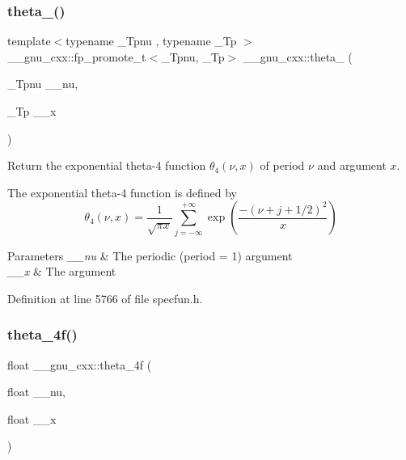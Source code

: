 \subsubsection{\texorpdfstring{theta\+\_()}{theta\_4()}}
{\footnotesize\ttfamily template$<$typename \+\_\+\+Tpnu , typename \+\_\+\+Tp $>$ \\
\+\_\+\+\_\+gnu\+\_\+cxx\+::fp\+\_\+promote\+\_\+t$<$\+\_\+\+Tpnu, \+\_\+\+Tp$>$ \+\_\+\+\_\+gnu\+\_\+cxx\+::theta\+\_ (\begin{DoxyParamCaption}\item[{\+\_\+\+Tpnu}]{\+\_\+\+\_\+nu,  }\item[{\+\_\+\+Tp}]{\+\_\+\+\_\+x }\end{DoxyParamCaption})\hspace{0.3cm}{\ttfamily [inline]}}

Return the exponential theta-\/4 function $ \theta_4(\nu,x) $ of period $ \nu $ and argument $ x $.

The exponential theta-\/4 function is defined by \[ \theta_4(\nu,x) = \frac{1}{\sqrt{\pi x}} \sum_{j=-\infty}^{+\infty} \exp\left( \frac{-(\nu + j + 1/2)^2}{x} \right) \]


\begin{DoxyParams}{Parameters}
{\em \+\_\+\+\_\+nu} & The periodic (period = 1) argument \\
\hline
{\em \+\_\+\+\_\+x} & The argument \\
\hline
\end{DoxyParams}


Definition at line 5766 of file specfun.\+h.

\mbox{\label{group__gnu__math__spec__func_ga0c5cbf87e304844ed4c3423be5ca09a5}} 
\subsubsection{\texorpdfstring{theta\+\_\+4f()}{theta\_4f()}}
{\footnotesize\ttfamily float \+\_\+\+\_\+gnu\+\_\+cxx\+::theta\+\_\+4f (\begin{DoxyParamCaption}\item[{float}]{\+\_\+\+\_\+nu,  }\item[{float}]{\+\_\+\+\_\+x }\end{DoxyParamCaption})\hspace{0.3cm}{\ttfamily [inline]}}

